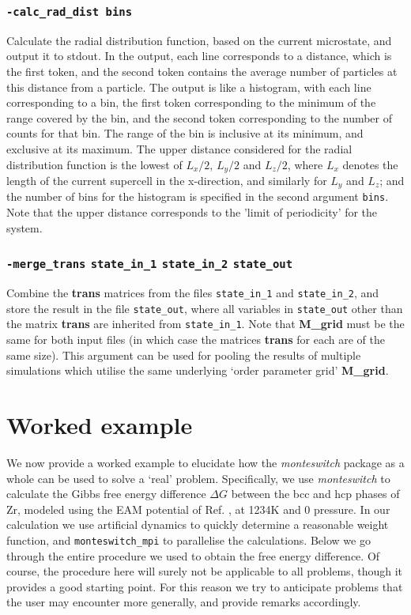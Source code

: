 \documentclass{report}
\begin{document}
\subsection{\texttt{-calc\_rad\_dist bins}}
Calculate the radial distribution function, based on the current microstate, and output it to stdout. In the output, each line corresponds 
to a distance, which is the first token, and the second token contains the average number of particles at this distance from a particle. The 
output is like a histogram, with each line corresponding to a bin, the first token corresponding to the minimum of the range covered by the 
bin, and the second token corresponding to the number of counts for that bin. The range of the bin is inclusive at its minimum, and 
exclusive at its maximum. The upper distance considered for the radial distribution function is the lowest of $L_x/2$, $L_y/2$ and $L_z/2$,
where $L_x$ denotes the length of the current supercell in the x-direction, and similarly for $L_y$ and $L_z$; and the number of bins for 
the histogram is specified in the second argument \texttt{bins}. Note that the upper distance corresponds to the 'limit of periodicity' for the system. 

\subsection{\texttt{-merge\_trans} \texttt{state\_in\_1}  \texttt{state\_in\_2} \texttt{state\_out}}
Combine the \textbf{trans} matrices from the files \texttt{state\_in\_1} and \texttt{state\_in\_2}, and store the result in the 
file \texttt{state\_out}, where all variables in \texttt{state\_out} other than the matrix \textbf{trans} are inherited from 
\texttt{state\_in\_1}. Note that \textbf{M\_grid} must be the same for both input files (in which case the matrices \textbf{trans} for
each are of the same size). This argument can be used for pooling the results of multiple simulations which utilise the same underlying
`order parameter grid' \textbf{M\_grid}.


\chapter{Worked example}\label{chapter:example}
We now provide a worked example to elucidate how the \emph{monteswitch} package as a whole can be used to solve a `real' problem.
Specifically, we use \emph{monteswitch} to calculate the Gibbs free energy difference $\Delta G$ between the bcc and hcp
phases of Zr, modeled using the EAM potential of Ref. \cite{Mendelev_2007}, at 1234K and 0 pressure. 
In our calculation we use artificial dynamics to quickly determine a reasonable weight function, and \texttt{monteswitch\_mpi} to
parallelise the calculations. Below we go through the entire procedure we used to obtain the free energy
difference. Of course, the procedure here will surely not be applicable to all problems, though it provides a good starting point. 
For this reason we try to anticipate problems that the user may encounter more generally, and provide remarks accordingly.
\end{document}
